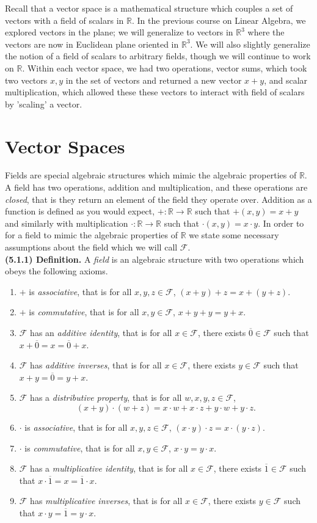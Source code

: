 \documentclass[12pt]{book}
\def\R{{\mathbb{R}}}
\def\eq[#1]{{\overline{#1}}}
\def\cF{{\mathcal{F}}}
\begin{document}
	Recall that a vector space is a mathematical structure which couples a set of vectors with a field of scalars in $\R$. In the previous course on Linear Algebra, we explored vectors in the plane; we will generalize to vectors in $\R^3$ where the vectors are now in Euclidean plane oriented in $\R^3$. We will also slightly generalize the notion of a field of scalars to arbitrary fields, though we will continue to work on $\R$. Within each vector space, we had two operations, vector sums, which took two vectors $x,y$ in the set of vectors and returned a new vector $x+y$, and scalar multiplication, which allowed these these vectors to interact with field of scalars by 'scaling' a vector. 

\section{Vector Spaces}

Fields are special algebraic structures which mimic the algebraic properties of $\R$. A field has two operations, addition and multiplication, and these operations are \textit{closed}, that is they return an element of the field they operate over. Addition as a function is defined as you would expect, $+\colon\R\rightarrow\R$ such that $+(x,y)=x+y$ and similarly with multiplication $\cdot\colon\R\rightarrow\R$ such that $\cdot(x,y)=x\cdot y$. In order to for a field to mimic the algebraic properties of $\R$ we state some necessary assumptions about the field which we will call $\cF$.\\

\noindent\textbf{(5.1.1) Definition.} A \textit{field} is an algebraic structure with two operations which obeys the following axioms.
\begin{enumerate}[itemsep=0.1cm]
\item $+$ is \textit{associative}, that is for all $x,y,z\in\cF$, $(x+y)+z=x+(y+z)$.
\item $+$ is \textit{commutative}, that is for all $x,y\in\cF$, $x+y+y=y+x$.
\item $\cF$ has an \textit{additive identity}, that is for all $x\in\cF$, there exists $\eq[0]\in\cF$ such that $x+\eq[0]=x=\eq[0]+x$.
\item $\cF$ has \textit{additive inverses}, that is for all $x\in\cF$, there exists $y\in\cF$ such that $x+y=\eq[0]=y+x$.
\item $\cF$ has a \textit{distributive property}, that is for all $w,x,y,z\in\cF$, \[(x+y)\cdot(w+z)=x\cdot w+x\cdot z+y\cdot w+y\cdot z.\]
\item $\cdot$ is \textit{associative}, that is for all $x,y,z\in\cF$, $(x\cdot y)\cdot z=x\cdot(y\cdot z)$.
\item $\cdot$ is \textit{commutative}, that is for all $x,y\in\cF$, $x\cdot y=y\cdot x$.
\item $\cF$ has a \textit{multiplicative identity}, that is for all $x\in\cF$, there exists $\eq[1]\in\cF$ such that $x\cdot \eq[1]=x=\eq[1]\cdot x$.
\item $\cF$ has \textit{multiplicative inverses}, that is for all $x\in\cF$, there exists $y\in\cF$ such that $x\cdot y=\eq[1]=y\cdot x$.
\end{enumerate}
\end{document}
